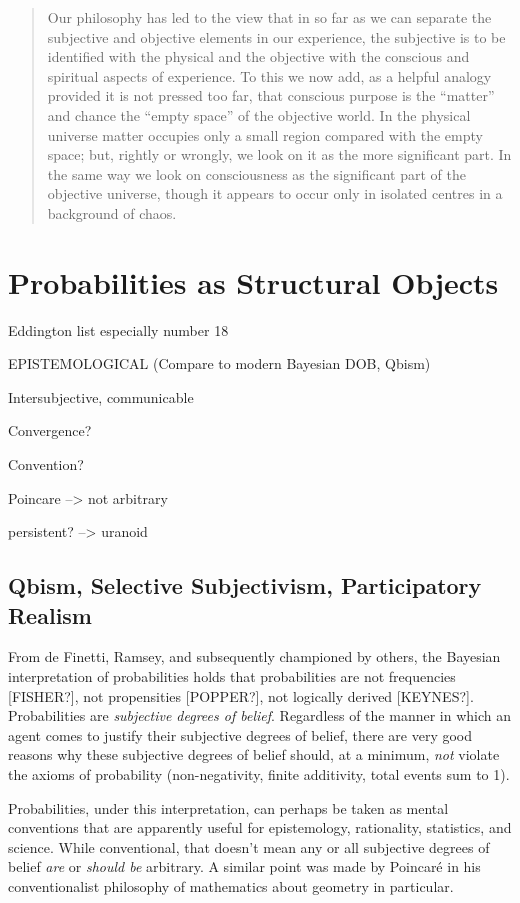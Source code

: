 \begin{quote}
    Our philosophy has led to the view that in so far as we can separate the subjective and objective elements in our experience, the subjective is to be identified with the physical and the objective with the conscious and spiritual aspects of experience.  To this we now add, as a helpful analogy provided it is not pressed too far, that conscious purpose is the ``matter'' and chance the ``empty space'' of the objective world.  In the physical universe matter occupies only a small region compared with the empty space; but, rightly or wrongly, we look on it as the more significant part.  In the same way we look on consciousness as the significant part of the objective universe, though it appears to occur only in isolated centres in a background of chaos.  \citep[p. 180-184]{Eddington1939}
\end{quote}

\section{Probabilities as Structural Objects}

Eddington list especially number 18

EPISTEMOLOGICAL (Compare to modern Bayesian DOB, Qbism)

Intersubjective, communicable

Convergence?

Convention?

Poincare --> not arbitrary

persistent?  --> uranoid

\subsection{Qbism, Selective Subjectivism, Participatory Realism}

From de Finetti, Ramsey, and subsequently championed by others, the Bayesian interpretation of probabilities holds that probabilities are not frequencies [FISHER?], not propensities [POPPER?], not logically derived [KEYNES?].  Probabilities are \emph{subjective degrees of belief}. Regardless of the manner in which an agent comes to justify their subjective degrees of belief, there are very good reasons why these subjective degrees of belief should, at a minimum, \emph{not} violate the axioms of probability (non-negativity, finite additivity, total events sum to 1).

Probabilities, under this interpretation, can perhaps be taken as mental conventions that are apparently useful for epistemology, rationality, statistics, and science.  While conventional, that doesn't mean any or all subjective degrees of belief \emph{are} or \emph{should be} arbitrary.  A similar point was made by Poincar\'e in his conventionalist philosophy of mathematics about geometry in particular.  

